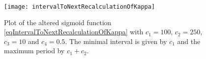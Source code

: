 
\begin{figure}[bhtp]
	\centering
	\texttt{[image: intervalToNextRecalculationOfKappa]}
	\caption[Plot of the altered sigmoid function \eqref{eqIntervalToNextRecalculationOfKappa}, used for determination of the interval to the next recalculation of $\kappa$ in a $\kappa M$ node]{
			Plot of the altered sigmoid function \eqref{eqIntervalToNextRecalculationOfKappa} with $c_1=100$, $c_2=250$, $c_3=10$ and $c_4=0.5$.
			The minimal interval is given by $c_1$ and the maximum period by $c_1+c_2$.  }
	\label{figIntervalToNextRecalculationOfKappa}
\end{figure}


